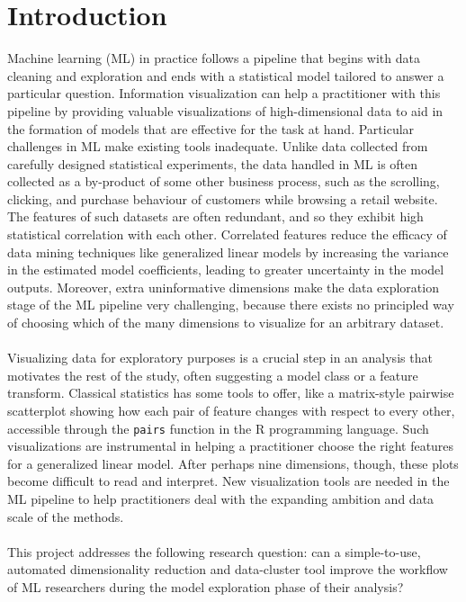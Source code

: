 \documentclass{sigchi}
\begin{document}
\section{Introduction}
%
%
%
Machine learning (ML) in practice follows a pipeline that begins with data cleaning and exploration and ends with a statistical model tailored to answer a particular question. %
%
Information visualization can help a practitioner with this pipeline by providing valuable visualizations of high-dimensional data to aid in the formation of models that are effective for the task at hand. %
%
Particular challenges in ML make existing tools inadequate. %
%
Unlike data collected from carefully designed statistical experiments, the data handled in ML is often collected as a by-product of some other business process, such as the scrolling, clicking, and purchase behaviour of customers while browsing a retail website. %
%
The features of such datasets are often redundant, and so they exhibit high statistical correlation with each other. %
%
Correlated features reduce the efficacy of data mining techniques like generalized linear models by increasing the variance in the estimated model coefficients, leading to greater uncertainty in the model outputs. %
%
Moreover, extra uninformative dimensions make the data exploration stage of the ML pipeline very challenging, because there exists no principled way of choosing which of the many dimensions to visualize for an arbitrary dataset. %
%
\\\\
%
Visualizing data for exploratory purposes is a crucial step in an analysis that motivates the rest of the study, often suggesting a model class or a feature transform. %
%
Classical statistics has some tools to offer, like a matrix-style pairwise scatterplot showing how each pair of feature changes with respect to every other, accessible through the \texttt{pairs} function in the R programming language. %
%
Such visualizations are instrumental in helping a practitioner choose the right features for a generalized linear model. %
%
After perhaps nine dimensions, though, these plots become difficult to read and interpret. %
New visualization tools are needed in the ML pipeline to help practitioners deal with the expanding ambition and data scale of the methods. %
%
\\\\
%
This project addresses the following research question: can a simple-to-use, automated dimensionality reduction and data-cluster tool improve the workflow of ML researchers during the model exploration phase of their analysis? %
\end{document}
